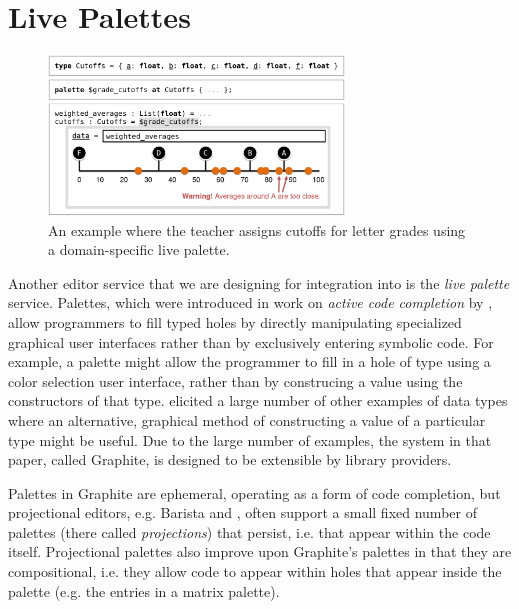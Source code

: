 
\section{Live Palettes}
\label{sec:palettes}


\begin{figure}[t]
\vspace{-4px}
\includegraphics[width=0.7\textwidth]{images/cutoffs-new-elided.png}
\caption{An example where the teacher assigns cutoffs 
for letter grades using a domain-specific live palette.}
\label{fig:cutoffs-example}
\vspace{-4px}
\end{figure}

Another editor service that we are designing for integration into \Hazel 
is the \emph{live palette} service.
Palettes, which were introduced in work on
\emph{active code completion} by \citet{ActiveCodeCompletion},  allow programmers to fill typed 
holes by directly manipulating specialized graphical user interfaces rather than by exclusively entering symbolic
code. For example, a palette might allow the programmer to 
fill in a hole of type  using a color selection  
user interface, rather than by construcing a  value  
using the constructors of that type. \citet{ActiveCodeCompletion} elicited a large number of other
examples of data types where an alternative, graphical 
method of constructing a value of a particular type might be
useful. Due to the large number of examples, the system in that paper, called {Graphite}, is designed to be extensible by library providers. 

Palettes in {Graphite} 
are ephemeral, operating as a form of code completion, but projectional editors, e.g. Barista \cite{ko_barista:_2006} and  \cite{voelter_mbeddr:_2012}, often support a small fixed number of  
palettes (there called \emph{projections}) that persist, i.e. that appear within the code itself. 
Projectional palettes also improve upon Graphite's palettes in that they are compositional, i.e. they allow code to appear within holes that appear inside the palette (e.g. the entries in a matrix palette). 

